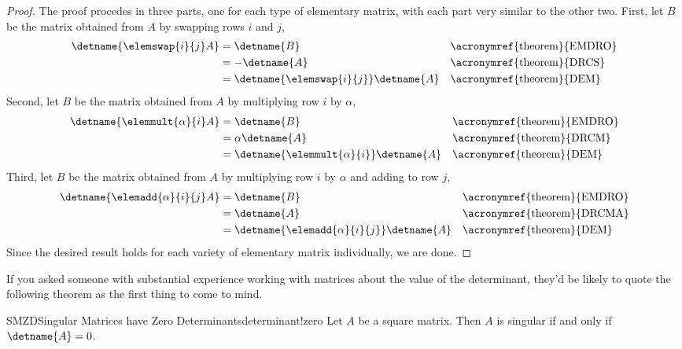 \begin{proof}
The proof procedes in three parts, one for each type of elementary matrix, with each part very similar to the other two.  
First, let $B$ be the matrix obtained from $A$ by swapping rows $i$ and $j$,
%
\begin{align*}
\detname{\elemswap{i}{j}A}
&=\detname{B}&&\text{\acronymref{theorem}{EMDRO}}\\
&=-\detname{A}&&\text{\acronymref{theorem}{DRCS}}\\
&=\detname{\elemswap{i}{j}}\detname{A}&&\text{\acronymref{theorem}{DEM}}
\end{align*}
%
Second, let $B$ be the matrix obtained from $A$ by multiplying row $i$ by $\alpha$,
%
\begin{align*}
\detname{\elemmult{\alpha}{i}A}
&=\detname{B}&&\text{\acronymref{theorem}{EMDRO}}\\
&=\alpha\detname{A}&&\text{\acronymref{theorem}{DRCM}}\\
&=\detname{\elemmult{\alpha}{i}}\detname{A}&&\text{\acronymref{theorem}{DEM}}
\end{align*}
%
Third, let $B$ be the matrix obtained from $A$ by multiplying row $i$ by $\alpha$ and adding to row $j$,
%
\begin{align*}
\detname{\elemadd{\alpha}{i}{j}A}
&=\detname{B}&&\text{\acronymref{theorem}{EMDRO}}\\
&=\detname{A}&&\text{\acronymref{theorem}{DRCMA}}\\
&=\detname{\elemadd{\alpha}{i}{j}}\detname{A}&&\text{\acronymref{theorem}{DEM}}
\end{align*}
%
Since the desired result holds for each variety of elementary matrix individually, we are done.
%
\end{proof}
%
%
If you asked someone with substantial experience working with matrices about the value of the determinant, they'd be likely to quote the following theorem as the first thing to come to mind.  
%
\begin{theorem}{SMZD}{Singular Matrices have Zero Determinants}{determinant!zero}
Let $A$ be a square matrix.  Then $A$ is singular if and only if $\detname{A}=0$.
\end{theorem}
%
